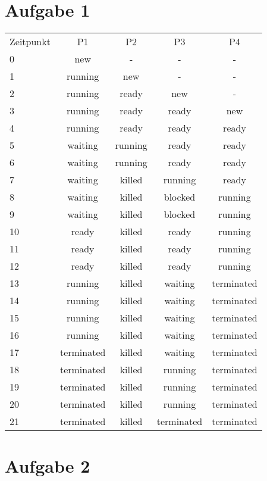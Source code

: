 \documentclass[numbers=noendperiod]{scrartcl}
\begin{document}
\section{Aufgabe 1}
\begin{tabular}{lcccc}
	Zeitpunkt & P1 & P2 & P3 & P4 \\
	0 & new & - & - & - \\
	1 & running & new & - & - \\
	2 & running & ready  & new & - \\
	3 & running & ready & ready & new \\
	4 & running & ready & ready & ready \\
	5 & waiting & running & ready & ready \\
	6 & waiting & running & ready & ready \\
	7 & waiting & killed & running & ready \\
	8 & waiting & killed & blocked & running \\
	9 & waiting & killed & blocked & running \\
	10 & ready & killed & ready & running \\
	11 & ready & killed & ready & running \\
	12 & ready & killed & ready & running \\
	13 & running & killed & waiting & terminated \\
	14 & running & killed & waiting & terminated \\
	15 & running & killed & waiting & terminated \\
	16 & running & killed & waiting & terminated \\
	17 & terminated & killed & waiting & terminated \\
	18 & terminated & killed & running & terminated \\
	19 & terminated & killed & running & terminated \\
	20 & terminated & killed & running & terminated \\
	21 & terminated & killed & terminated & terminated \\
	


\end{tabular}	
\section{Aufgabe 2}
	
\end{document}
